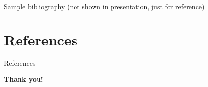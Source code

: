 \documentclass[aspectratio=169,xcolor=dvipsnames]{beamer}
\begin{document}
Sample bibliography (not shown in presentation, just for reference)
\section{References}
\begin{frame}[allowframebreaks]{References}
    \small
    \printbibliography
\end{frame}


\begin{frame}[plain]
  \centering
  \Huge \textbf{Thank you!}
\end{frame}
\end{document}
